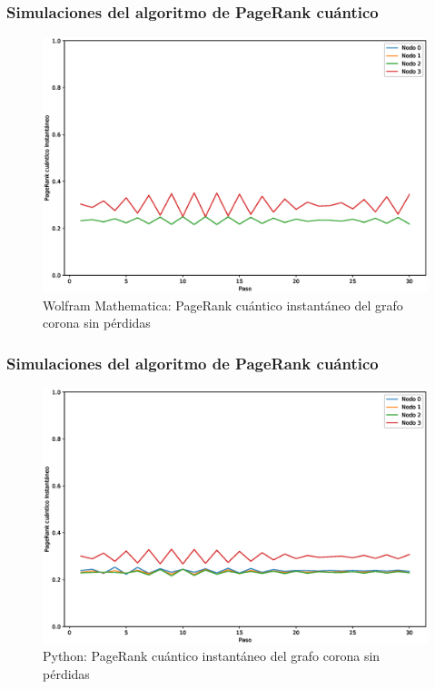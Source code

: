 \documentclass[xetex,mathserif,serif, 8pt]{beamer}
\begin{document}
\begin{frame}
    \frametitle{Simulaciones del algoritmo de PageRank cuántico}

    \begin{figure}[H]
        \centering
        \includegraphics[width=0.9\linewidth]{img/crown-inst-M.eps}
        \caption{Wolfram Mathematica: PageRank cuántico instantáneo del grafo corona sin pérdidas}
    \end{figure}

\end{frame}

\begin{frame}
    \frametitle{Simulaciones del algoritmo de PageRank cuántico}

    \begin{figure}[H]
        \centering
        \includegraphics[width=0.9\linewidth]{img/crown-inst-lossless.eps}
        \caption{Python: PageRank cuántico instantáneo del grafo corona sin pérdidas}
\end{figure}

\end{frame}
\end{document}
